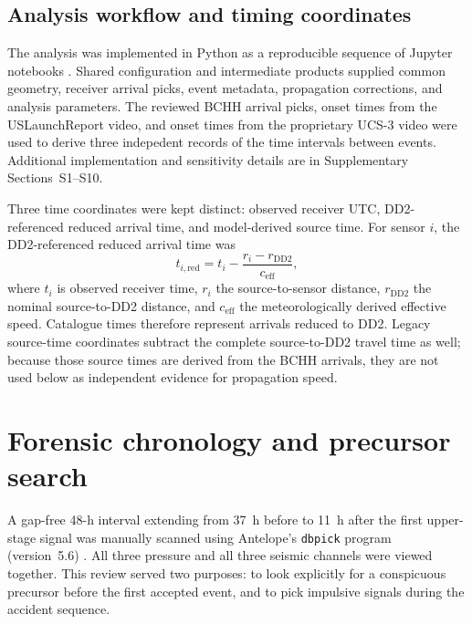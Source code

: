 \documentclass[]{seismica}
\begin{document}
\subsection{Analysis workflow and timing coordinates}

The analysis was implemented in Python as a reproducible sequence of Jupyter
notebooks \citep{kluyver2016jupyter}. Shared configuration and intermediate
products supplied common geometry, receiver arrival picks, event metadata,
propagation corrections, and analysis parameters. The reviewed BCHH arrival
picks, onset times from the USLaunchReport video, and onset times from the proprietary UCS-3 video
were used to derive three indepedent records of the time intervals between events. Additional
implementation and sensitivity details are in Supplementary Sections~S1--S10.

Three time coordinates were kept distinct: observed receiver UTC,
DD2-referenced reduced arrival time, and model-derived source time. For sensor
$i$, the DD2-referenced reduced arrival time was
\begin{equation}
 t_{i,\mathrm{red}}=t_i-\frac{r_i-r_{\mathrm{DD2}}}{c_{\mathrm{eff}}},
 \label{eq:reduced_time}
\end{equation}
where $t_i$ is observed receiver time, $r_i$ the source-to-sensor distance,
$r_{\mathrm{DD2}}$ the nominal source-to-DD2 distance, and
$c_{\mathrm{eff}}$ the meteorologically derived effective speed. Catalogue
times therefore represent arrivals reduced to DD2. Legacy source-time
coordinates subtract the complete source-to-DD2 travel time as well; because
those source times are derived from the BCHH arrivals, they are not used below
as independent evidence for propagation speed.

\FloatBarrier


\section{Forensic chronology and precursor search}
\label{sec:precursor}

A gap-free 48-h interval extending from 37~h before to 11~h after the first
upper-stage signal was manually scanned using Antelope's \texttt{dbpick}
program (version~5.6) \citep{brtt_antelope}. All three pressure and all three
seismic channels were viewed together. This review served two purposes: to
look explicitly for a conspicuous precursor before the first accepted event,
and to pick impulsive signals during the accident sequence.
\end{document}
